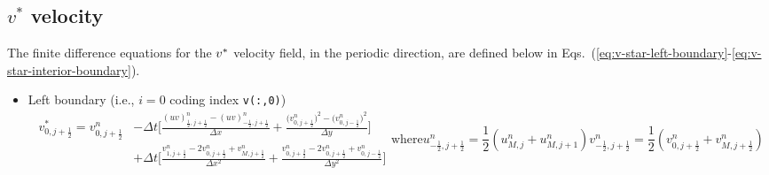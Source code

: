 \subsection{$v^{\ast}$ velocity}
The finite difference equations for the $v^{\ast}$ velocity field, in the
periodic direction, are defined below in
Eqs.~(\ref{eq:v-star-left-boundary}-\ref{eq:v-star-interior-boundary}).
\begin{itemize}
    \item Left boundary (i.e., $i=0$ coding index \texttt{v(:,0)})
        \begin{subequations}
            \begin{equation}
                \begin{aligned}
                    v^{\ast}_{0,j+\frac{1}{2}} = v^{n}_{0,j+ \frac{1}{2}} & -  \Delta t\Bigg[ 
                    \frac{
                        \left(uv\right)^{n}_{\frac{1}{2},j+\frac{1}{2}} - \left(uv\right)^{n}_{-\frac{1}{2},j+\frac{1}{2}}
                    }{\Delta x} +
                    \frac{
                        \big(v^{n}_{0,j+\frac{1}{2}}\big)^{2} - \big(v^{n}_{0,j-\frac{1}{2}}\big)^{2}
                    }{\Delta y}
                    \Bigg]\\
                    & + \Delta t \Bigg[
                        \frac{
                            v^{n}_{1,j+\frac{1}{2}} - 2v^{n}_{0,j+\frac{1}{2}} + v^{n}_{M, j+\frac{1}{2}}
                        }{\Delta x^{2}}
                     + 
                        \frac{
                            v^{n}_{0,j+\frac{3}{2}} - 2v^{n}_{0,j+\frac{1}{2}} + v^{n}_{0,j-\frac{1}{2}}
                        }{\Delta y^{2}}
                        \Bigg]
                \end{aligned}
            \end{equation}
            \text{where} 
            \begin{equation}
                u^{n}_{-\frac{1}{2},j+\frac{1}{2}} = 
                                \frac{1}{2} \left(u^{n}_{M,j} + u^{n}_{M,j+1} \right)
            \end{equation}
            \begin{equation}
                v^{n}_{-\frac{1}{2}, j+\frac{1}{2}} =
                                \frac{1}{2} \left( v^{n}_{0, j+\frac{1}{2}} + v^{n}_{M, j+\frac{1}{2}} \right)
            \end{equation}


\end{subequations}
\end{itemize}
